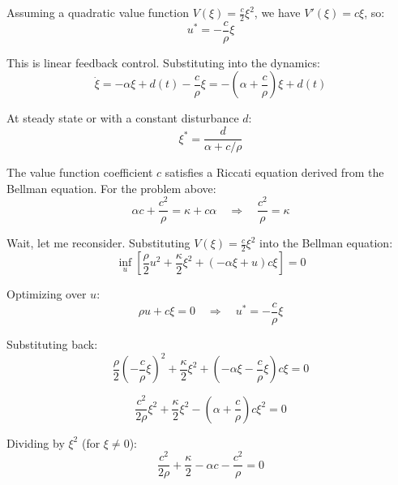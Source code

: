 \documentclass[12pt]{article}
\begin{document}
Assuming a quadratic value function $V(\xi) = \frac{c}{2} \xi^2$, we have $V'(\xi) = c \xi$, so:
\begin{equation}
u^* = -\frac{c}{\rho} \xi
\end{equation}

This is linear feedback control. Substituting into the dynamics:
\begin{equation}
\dot{\xi} = -\alpha \xi + d(t) - \frac{c}{\rho} \xi = -\left( \alpha + \frac{c}{\rho} \right) \xi + d(t)
\end{equation}

At steady state or with a constant disturbance $d$:
\begin{equation}
\xi^* = \frac{d}{\alpha + c/\rho}
\end{equation}

The value function coefficient $c$ satisfies a Riccati equation derived from the Bellman equation. For the problem above:
\begin{equation}
\alpha c + \frac{c^2}{\rho} = \kappa + c \alpha \quad \Rightarrow \quad \frac{c^2}{\rho} = \kappa
\end{equation}

Wait, let me reconsider. Substituting $V(\xi) = \frac{c}{2} \xi^2$ into the Bellman equation:
\begin{equation}
\inf_u \left[ \frac{\rho}{2} u^2 + \frac{\kappa}{2} \xi^2 + (-\alpha \xi + u) c \xi \right] = 0
\end{equation}

Optimizing over $u$:
\begin{equation}
\rho u + c \xi = 0 \quad \Rightarrow \quad u^* = -\frac{c}{\rho} \xi
\end{equation}

Substituting back:
\begin{equation}
\frac{\rho}{2} \left( -\frac{c}{\rho} \xi \right)^2 + \frac{\kappa}{2} \xi^2 + \left( -\alpha \xi - \frac{c}{\rho} \xi \right) c \xi = 0
\end{equation}

\begin{equation}
\frac{c^2}{2\rho} \xi^2 + \frac{\kappa}{2} \xi^2 - \left( \alpha + \frac{c}{\rho} \right) c \xi^2 = 0
\end{equation}

Dividing by $\xi^2$ (for $\xi \neq 0$):
\begin{equation}
\frac{c^2}{2\rho} + \frac{\kappa}{2} - \alpha c - \frac{c^2}{\rho} = 0
\end{equation}
\end{document}
